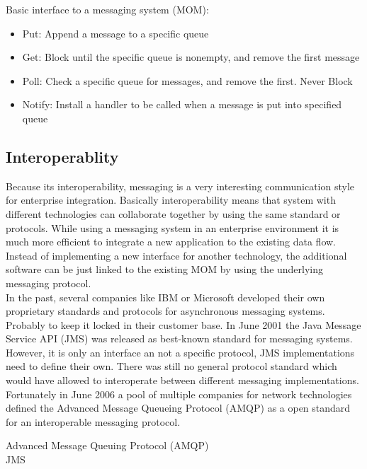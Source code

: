 Basic interface to a messaging system (MOM): \cite{TAN06}
\begin{itemize}
	\item Put: Append a message to a specific queue 
	\item Get: Block until the specific queue is nonempty, and remove the
first message 
	\item Poll: Check a specific queue for messages, and remove the first.
Never Block 
	\item Notify: Install a handler to be called when a message is put into
specified queue
\end{itemize}

\subsection{Interoperablity}
Because its interoperability, messaging is a very interesting communication
style for enterprise integration. Basically interoperability means that system with
different technologies can collaborate together by using the same standard or
protocols. While using a messaging system in an enterprise environment it is
much more efficient to integrate a new application to the existing data flow.
Instead of implementing a new interface for another technology, the additional
software can be just linked to the existing MOM by using the underlying
messaging protocol.\\

In the past, several companies like IBM or Microsoft developed their own
proprietary standards and protocols for asynchronous messaging systems.
Probably to keep it locked in their customer base. In June 2001 the Java Message
Service API (JMS) was released as best-known standard for messaging systems.
However, it is only an interface an not a specific protocol, JMS implementations
need to define their own. There was still no general protocol standard which
would have allowed to interoperate between different messaging implementations.
Fortunately in June 2006 a pool of multiple companies for network technologies
defined the Advanced Message Queueing Protocol (AMQP) as a open standard for an
interoperable messaging protocol. \cite{PrpAMQP}
 
\begin{description} 
	\item [Advanced Message Queuing Protocol (AMQP)] \hfill
	
    \item [JMS]	
\end{description}

